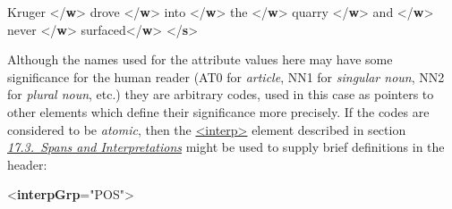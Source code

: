 \begin{shaded}
Kruger {</\textbf{w}>}\mbox{}\newline 
{}drove {</\textbf{w}>}\mbox{}\newline 
{}into {</\textbf{w}>}\mbox{}\newline 
{}the {</\textbf{w}>}\mbox{}\newline 
{}quarry {</\textbf{w}>}\mbox{}\newline 
{}and {</\textbf{w}>}\mbox{}\newline 
{}never {</\textbf{w}>}\mbox{}\newline 
{}surfaced{</\textbf{w}>}\mbox{}\newline 
{</\textbf{s}>}\end{shaded}\egroup\par \noindent  Although the names used for the attribute values here may have some significance for the human reader (AT0 for \textit{article}, NN1 for \textit{singular noun}, NN2 for \textit{plural noun}, etc.) they are arbitrary codes, used in this case as pointers to other elements which define their significance more precisely. If the codes are considered to be \textit{atomic}, then the \hyperref[TEI.interp]{<interp>} element described in section \textit{\hyperref[AISP]{17.3.\ Spans and Interpretations}} might be used to supply brief definitions in the header: \par\bgroup{}\exampleFont \begin{shaded}\noindent\mbox{}{<\textbf{interpGrp}\hspace*{1em}{type}="{POS}">}\mbox{}\newline 

\end{shaded}
